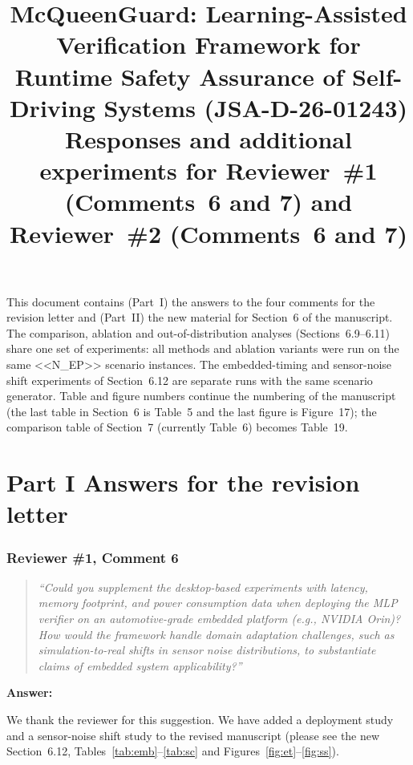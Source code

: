 \documentclass[11pt]{article}
\title{\vspace{-1.4cm}McQueenGuard: Learning-Assisted Verification Framework for Runtime Safety Assurance of Self-Driving Systems (JSA-D-26-01243)\\[4pt]
\large Responses and additional experiments for Reviewer~\#1 (Comments~6 and 7) and Reviewer~\#2 (Comments~6 and 7)}
\date{}
\newenvironment{revcomment}{\begin{quote}\itshape}{\end{quote}}
\newcommand{\answerhead}[1]{\par\medskip\noindent\textbf{#1}\par}
\begin{document}
\maketitle
\vspace{-1.3cm}
\noindent This document contains (Part~I) the answers to the four comments for the revision letter and (Part~II) the new
material for Section~6 of the manuscript. The comparison, ablation and out-of-distribution analyses (Sections~6.9--6.11) share one set of experiments: all methods
and ablation variants were run on the same <<N_EP>> scenario instances. The embedded-timing and sensor-noise shift experiments of
Section~6.12 are separate runs with the same scenario generator.
Table and figure numbers continue the numbering of the manuscript (the last table in Section~6 is Table~5 and the last figure is
Figure~17); the comparison table of Section~7 (currently Table~6) becomes Table~19.

\tableofcontents

\part*{Part I \quad Answers for the revision letter}

\section*{Reviewer \#1, Comment 6}
\begin{revcomment}
``Could you supplement the desktop-based experiments with latency, memory footprint, and power consumption data when deploying
the MLP verifier on an automotive-grade embedded platform (e.g., NVIDIA Orin)? How would the framework handle domain adaptation
challenges, such as simulation-to-real shifts in sensor noise distributions, to substantiate claims of embedded system
applicability?''
\end{revcomment}
\answerhead{Answer:}
We thank the reviewer for this suggestion. We have added a deployment study and a sensor-noise shift study to the revised
manuscript (please see the new Section~6.12, Tables~\ref{tab:emb}--\ref{tab:sc} and Figures~\ref{fig:et}--\ref{fig:ss}).
\end{document}
